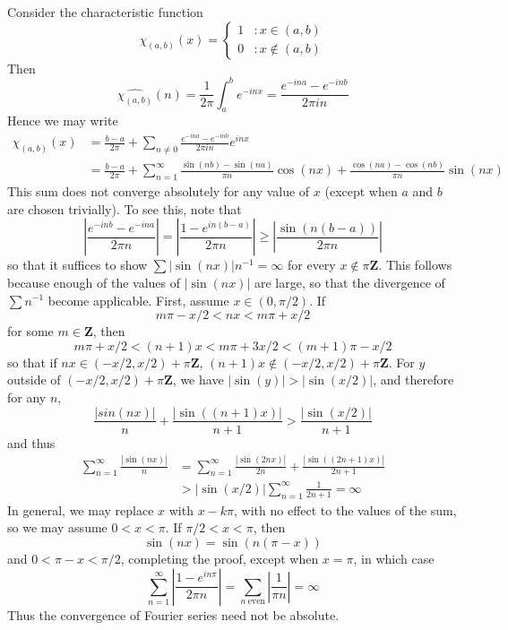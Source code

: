 \begin{example}
    Consider the characteristic function
    \[ \chi_{(a,b)}(x) = \begin{cases} 1 & : x \in (a,b) \\ 0 & : x \not \in (a,b) \end{cases} \]
    Then
    \[ \widehat{\chi_{(a,b)}}(n) = \frac{1}{2\pi} \int_a^b e^{-inx} = \frac{e^{-ina} - e^{-inb}}{2\pi i n} \]
    Hence we may write
    \begin{align*}
        \chi_{(a,b)}(x) &= \frac{b-a}{2\pi} + \sum_{n \neq 0} \frac{e^{-ina} - e^{-inb}}{2 \pi i n} e^{inx}\\
        &= \frac{b-a}{2\pi} + \sum_{n = 1}^\infty \frac{\sin(nb) - \sin(na)}{\pi n} \cos(nx) + \frac{\cos(na) - \cos(nb)}{\pi n} \sin(nx)
    \end{align*}
    This sum does not converge absolutely for any value of $x$ (except when $a$ and $b$ are chosen trivially). To see this, note that
    \[ \left|\frac{e^{-inb} - e^{-ina}}{2 \pi n}\right| = \left| \frac{1 - e^{in(b-a)}}{2 \pi n} \right| \geq \left| \frac{\sin(n(b-a))}{2 \pi n} \right| \]
    so that it suffices to show $\sum |\sin(nx)| n^{-1} = \infty$ for every $x \not \in \pi \mathbf{Z}$. This follows because enough of the values of $|\sin(nx)|$ are large, so that the divergence of $\sum n^{-1}$ become applicable. First, assume $x \in (0,\pi/2)$. If
    \[ m \pi - x/2 < nx < m \pi + x/2 \]
    for some $m \in \mathbf{Z}$, then
    \[ m \pi + x/2 < (n+1)x < m \pi + 3x/2 < (m+1) \pi - x/2 \]
    so that if $nx \in (-x/2,x/2) + \pi \mathbf{Z}$, $(n+1)x \not \in (-x/2,x/2) + \pi \mathbf{Z}$. For $y$ outside of $(-x/2,x/2) + \pi \mathbf{Z}$, we have $|\sin(y)| > |\sin(x/2)|$, and therefore for any $n$,
    \[ \frac{|sin(nx)|}{n} + \frac{|\sin((n+1)x)|}{n+1} > \frac{|\sin(x/2)|}{n+1} \]
    and thus
    \begin{align*}
        \sum_{n = 1}^\infty \frac{|\sin(nx)|}{n} &= \sum_{n = 1}^\infty \frac{|\sin(2nx)|}{2n} + \frac{|\sin((2n+1)x)|}{2n+1}\\
        &> |\sin(x/2)| \sum_{n = 1}^\infty \frac{1}{2n+1} = \infty
    \end{align*}
    In general, we may replace $x$ with $x - k \pi$, with no effect to the values of the sum, so we may assume $0 < x < \pi$. If $\pi/2 < x < \pi$, then
    \[ \sin(nx) = \sin(n(\pi - x)) \]
    and $0 < \pi - x < \pi/2$, completing the proof, except when $x = \pi$, in which case
    \[ \sum_{n = 1}^\infty \left| \frac{1 - e^{in \pi}}{2 \pi n} \right| = \sum_{n\ \text{even}} \left| \frac{1}{\pi n} \right| = \infty \]
    Thus the convergence of Fourier series need not be absolute.
\end{example}

